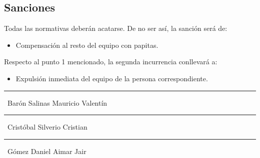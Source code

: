 \subsection{Sanciones}
\label{sanciones}

Todas las normativas deberán acatarse. De no ser así, la sanción será de:

\begin{itemize}
	\tightlist

	\item Compensación al resto del equipo con papitas.
\end{itemize}

Respecto al punto 1 mencionado, la segunda incurrencia conllevará a:

\begin{itemize}
	\tightlist

	\item Expulsión inmediata del equipo de la persona correspondiente.
\end{itemize}

\vspace*{48px}

\noindent\begin{minipage}{0.325\linewidth}
	\begin{center}
		\par\noindent\rule{0.9\textwidth}{0.8pt}
		\noindent\ Barón Salinas Mauricio Valentín
	\end{center}
\end{minipage}
\noindent\begin{minipage}{0.325\linewidth}
	\begin{center}
		\par\noindent\rule{0.9\textwidth}{0.8pt}
		\noindent\ Cristóbal Silverio Cristian
	\end{center}
\end{minipage}
\noindent\begin{minipage}{0.325\linewidth}
	\begin{center}
		\par\noindent\rule{0.9\textwidth}{0.8pt}
		\noindent\ Gómez Daniel Aimar Jair
	\end{center}
\end{minipage}

\vspace*{48px}

